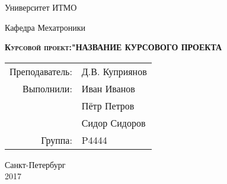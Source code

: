 \begin{titlepage}
	\newpage
	
	\begin{center}
		Университет ИТМО \\
	\end{center}
	
	\vspace{1em}
	
	\begin{center}
		\Large Кафедра Мехатроники \\ 
	\end{center}
	
	\vspace{8em}
	
	\begin{center}
		\textsc{\textbf{Курсовой проект:\linebreak \newline \huge "НАЗВАНИЕ КУРСОВОГО ПРОЕКТА}}
	\end{center}
	
	\vspace{14em}
\begin{flushright}
	\begin{tabular}{rl}
		Преподаватель: & Д.В. Куприянов \\
		Выполнили: & Иван Иванов  \\
		&  Пётр Петров \\
		&  Сидор Сидоров \\
		Группа: & P4444\\
	\end{tabular}
\end{flushright}
	

	
	
	\vspace{\fill}
	
	\begin{center}
		Санкт-Петербург \\2017
	\end{center}
	
\end{titlepage}